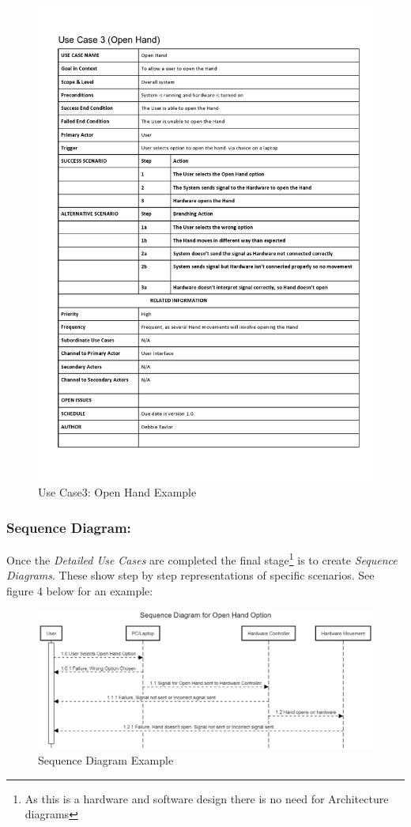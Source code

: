\documentclass[progress]{cmpreport}
\begin{document}
\begin{figure}[H] 
	\caption{Use Case3: Open Hand Example}
	\centering
	\includegraphics[trim=0cm 7cm 0cm 0.63cm, width=0.9 \textwidth, height=0.629 \textheight]{photos/UseCase_OpenHand.jpg}
\end{figure}

\subsubsection{Sequence Diagram:}

Once the \textit{Detailed Use Cases} are completed the final stage\footnote{As this is a hardware and software design there is no need for Architecture diagrams} is to create \textit{Sequence Diagrams}. These show step by step representations of specific scenarios. See figure 4 below for an example: 

\begin{figure}[H] 
	\caption{Sequence Diagram Example }
	\centering
	\includegraphics[height=0.6 \textheight, width=1 \textwidth]{photos/sequence_diagram.jpg}
\end{figure}
\end{document}
